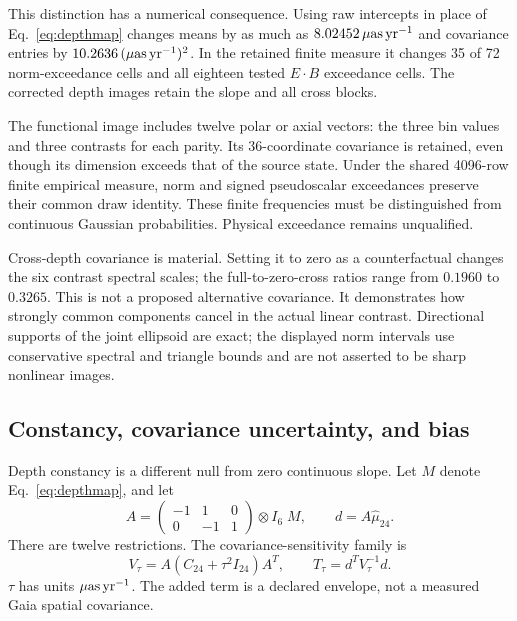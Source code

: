 This distinction has a numerical consequence. Using raw intercepts in place of Eq.~\eqref{eq:depthmap} changes means by as much as $8.02452\,\mu\mathrm{as}\,\mathrm{yr}^{-1}$ and covariance entries by $10.2636\,(\mu\mathrm{as}\,\mathrm{yr}^{-1})^2$. In the retained finite measure it changes 35 of 72 norm-exceedance cells and all eighteen tested $E\cdot B$ exceedance cells. The corrected depth images retain the slope and all cross blocks.

The functional image includes twelve polar or axial vectors: the three bin values and three contrasts for each parity. Its 36-coordinate covariance is retained, even though its dimension exceeds that of the source state. Under the shared 4096-row finite empirical measure, norm and signed pseudoscalar exceedances preserve their common draw identity. These finite frequencies must be distinguished from continuous Gaussian probabilities. Physical exceedance remains unqualified.

Cross-depth covariance is material. Setting it to zero as a counterfactual changes the six contrast spectral scales; the full-to-zero-cross ratios range from $0.1960$ to $0.3265$. This is not a proposed alternative covariance. It demonstrates how strongly common components cancel in the actual linear contrast. Directional supports of the joint ellipsoid are exact; the displayed norm intervals use conservative spectral and triangle bounds and are not asserted to be sharp nonlinear images.

\subsection{Constancy, covariance uncertainty, and bias}

Depth constancy is a different null from zero continuous slope. Let $M$ denote Eq.~\eqref{eq:depthmap}, and let
\begin{equation}
 A=\begin{pmatrix}-1&1&0\\0&-1&1\end{pmatrix}\otimes I_6\;M,
 \qquad d=A\hat\mu_{24}.
\end{equation}
There are twelve restrictions. The covariance-sensitivity family is
\begin{equation}
 V_\tau=A(C_{24}+\tau^2I_{24})A^T,\qquad
 T_\tau=d^TV_\tau^{-1}d.
 \label{eq:covsensitivity}
\end{equation}
$\tau$ has units $\mu\mathrm{as}\,\mathrm{yr}^{-1}$. The added term is a declared envelope, not a measured Gaia spatial covariance.

